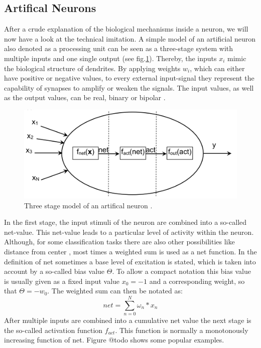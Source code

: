 \documentclass[12pt,a4paper]{article}
\begin{document}
\subsection{Artifical Neurons}
After a crude explanation of the biological mechanisms inside a neuron, we will now have a look at the technical imitation. A simple model of an artificial neuron also denoted as a processing unit can be seen as a three-stage system with multiple inputs and one single output (see fig.\ref{fig:artifical_neuron}).
\newline
Thereby, the inputs $x_i$ mimic the biological structure of dendrites. By applying weights $w_i$, which can either have positive or negative values, to every external input-signal they represent the capability of synapses to amplify or weaken the signals. The input values, as well as the output values,  can be real, binary or bipolar \cite{Patterson1997}.
\begin{figure}
    \centering
    \includegraphics[width=0.5\linewidth]{Figures/artificial_neuron.png}
    \caption{Three stage model of an artifical neuron \cite{Bartz2018}.}
    \label{fig:artifical_neuron}
\end{figure}
\newline
In the first stage, the input stimuli of the neuron are combined into a so-called net-value. This net-value leads to a particular level of activity within the neuron. Although, for some classification tasks there are also other possibilities like distance from center \cite{Schwenker2001}, most times a weighted sum is used as a net function. In the definition of net sometimes a base level of excitation is stated, which is taken into account by a so-called bias value $\Theta$. To allow a compact notation this bias value is usually given as a fixed input value $x_0 = -1$ and a corresponding weight, so that $\Theta = -w_0$. The weighted sum can then be notated as:
\begin{equation}
    \label{eq:net}
    net = \sum_{n=0}^N\omega_n * x_n
\end{equation}
After multiple inputs are combined into a cumulative net value the next stage is the so-called activation function $f_{act}$. This function is normally a monotonously increasing function of net. Figure @todo shows some popular examples.
\end{document}
